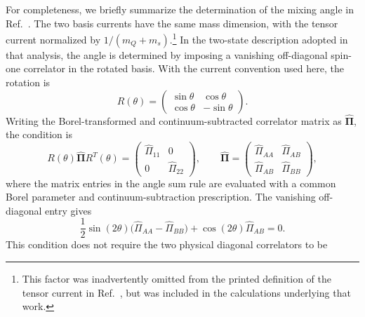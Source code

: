 
For completeness, we briefly summarize the determination of the mixing angle
in Ref.~\cite{Aliev:2025mixing}. The two basis currents have the same mass
dimension, with the tensor current normalized by $1/(m_Q+m_s)$.\footnote{This
factor was inadvertently omitted from the printed definition
of the tensor current in Ref.~\cite{Aliev:2025mixing}, but was included in
the calculations underlying that work.}
In the two-state description adopted in that analysis, the angle is determined
by imposing a vanishing off-diagonal spin-one correlator in the rotated basis.
With the current convention used here, the rotation is
\begin{equation}
 R(\theta)=
 \begin{pmatrix}
  \sin\theta & \cos\theta\\
  \cos\theta & -\sin\theta
 \end{pmatrix}.
 \label{eq:r1-angle-rotation}
\end{equation}
Writing the Borel-transformed and continuum-subtracted correlator matrix as
$\widehat{\boldsymbol\Pi}$, the condition is
\begin{equation}
 R(\theta)\widehat{\boldsymbol\Pi}R^T(\theta)
 =\begin{pmatrix}
   \widehat\Pi_{11}&0\\0&\widehat\Pi_{22}
  \end{pmatrix},
 \qquad
 \widehat{\boldsymbol\Pi}=
 \begin{pmatrix}
  \widehat\Pi_{AA}&\widehat\Pi_{AB}\\
  \widehat\Pi_{AB}&\widehat\Pi_{BB}
 \end{pmatrix},
 \label{eq:r1-angle-diagonalization}
\end{equation}
where the matrix entries in the angle sum rule are evaluated with a common
Borel parameter and continuum-subtraction prescription. The vanishing
off-diagonal entry gives
\begin{equation}
 \frac{1}{2}\sin(2\theta)
 \bigl(\widehat\Pi_{AA}-\widehat\Pi_{BB}\bigr)
 +\cos(2\theta)\widehat\Pi_{AB}=0.
 \label{eq:r1-angle-offdiagonal}
\end{equation}
This condition does not require the two physical diagonal correlators to be
